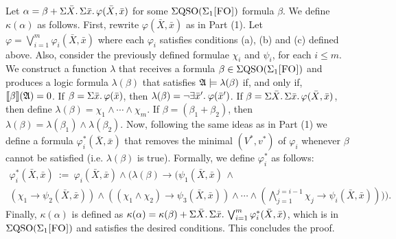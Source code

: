  Let $\alpha = \beta + \Sigma{\bar{X}}.\,\Sigma{\bar{x}}.\, \varphi(\bar{X},\bar{x})$ for some $\Sigma{\rm QSO}(\Sigma_{1}\textsc{[FO]})$ formula $\beta$. We define $\kappa(\alpha)$ as follows.
First, rewrite $\varphi(\bar{X},\bar{x})$ as in Part (1). Let $\varphi = \bigvee_{i = 1}^m\varphi_i(\bar{X},\bar{x})$ where each $\varphi_i$ satisfies conditions (a), (b) and (c) defined above. Also, consider the previously defined formulae $\chi_i$ and $\psi_i$, for each $i \leq m$. 
We construct a function $\lambda$ that receives a formula $\beta \in \Sigma{\rm QSO}(\Sigma_{1}\textsc{[FO]})$ and produces a logic formula $\lambda(\beta)$ that satisfies $\mathfrak{A}\models\lambda(\beta)$ if, and only if, ${\llbracket{}{\beta}\rrbracket}(\mathfrak{A}) = 0$. If $\beta = \Sigma{\bar{x}}.\, \varphi(\bar{x})$, then $\lambda(\beta) = \neg \exists{\bar{x}'}.\: \varphi(\bar{x}')$. If $\beta = \Sigma{\bar{X}}.\,\Sigma{\bar{x}}.\,\varphi(\bar{X},\bar{x})$, then 
define $\lambda(\beta) = \chi_1\wedge \cdots\wedge\chi_m$. If $\beta = (\beta_1 + \beta_2)$, then $\lambda(\beta) = \lambda(\beta_1) \wedge \lambda(\beta_2)$.
Now, following the same ideas as in Part (1) we define a formula $\varphi_i^*(\bar{X},\bar{x})$ that removes the minimal $(V^*, v^*)$ of $\varphi_i$ whenever $\beta$ cannot be satisfied (i.e. $\lambda(\beta)$ is true). Formally, we define $\varphi_i^*$ as follows:
\begin{multline*}
\varphi_i^*(\bar{X},\bar{x}) \ := \ \varphi_i(\bar{X},\bar{x})\wedge\Big(\lambda(\beta)\to\Big(\psi_1(\bar{X},\bar{x})\,\wedge \\
(\chi_1\to\psi_2(\bar{X},\bar{x}))\wedge((\chi_1\wedge\chi_2)\to\psi_3(\bar{X},\bar{x}))\wedge\cdots\wedge(
\bigwedge_{j = 1}^{j = i-1}\chi_j\to\psi_i(\bar{X},\bar{x}))\Big)\Big).
\end{multline*}
Finally, $\kappa(\alpha)$ is defined as $\kappa(\alpha) = \kappa(\beta) + \Sigma{\bar{X}}.\,\Sigma{\bar{x}}.\, \bigvee_{i = 1}^m\varphi_i^*(\bar{X},\bar{x})$, which is in $\Sigma{\rm QSO}(\Sigma_{1}\textsc{[FO]})$ and satisfies the desired conditions. This concludes the proof.
